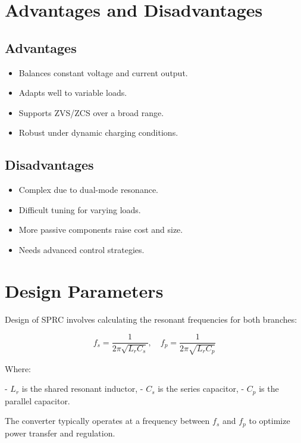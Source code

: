 \documentclass[12pt,a4paper]{report}
\begin{document}
\section{Advantages and Disadvantages}

\subsection*{Advantages}
\begin{itemize}
    \item Balances constant voltage and current output.
    \item Adapts well to variable loads.
    \item Supports ZVS/ZCS over a broad range.
    \item Robust under dynamic charging conditions.\cite{bertolini2021frequency}\cite{lin2021analysis}\cite{erickson2020resonant}
\end{itemize}

\subsection*{Disadvantages}
\begin{itemize}
    \item Complex due to dual-mode resonance.
    \item Difficult tuning for varying loads.
    \item More passive components raise cost and size.
    \item Needs advanced control strategies.\cite{bertolini2021frequency}\cite{lin2021analysis}\cite{erickson2020resonant}
\end{itemize}

\section{Design Parameters}

\quad Design of SPRC involves calculating the resonant frequencies for both branches:

\[
f_s = \frac{1}{2\pi \sqrt{L_r C_s}}, \quad f_p = \frac{1}{2\pi \sqrt{L_r C_p}}
\]

Where:

- \(L_r\) is the shared resonant inductor,
- \(C_s\) is the series capacitor,
- \(C_p\) is the parallel capacitor.

\quad The converter typically operates at a frequency between \(f_s\) and \(f_p\) to optimize power transfer and regulation.
\end{document}
